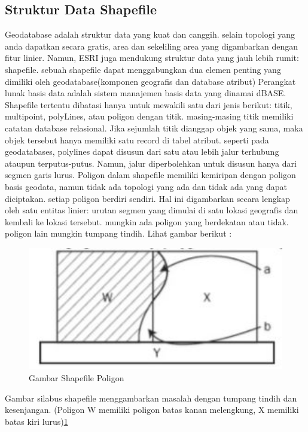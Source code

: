 \subsection{Struktur Data Shapefile}
Geodatabase adalah struktur data yang kuat dan canggih. selain topologi yang anda dapatkan secara gratis, area dan sekeliling area yang
digambarkan dengan fitur linier. Namun, ESRI juga mendukung struktur data yang jauh lebih rumit: shapefile. sebuah shapefile dapat menggabungkan dua elemen penting yang dimiliki oleh geodatabase(komponen geografis dan database atribut) Perangkat lunak 
basis data adalah sistem manajemen basis data yang dinamai dBASE. Shapefile tertentu dibatasi hanya untuk mewakili satu dari jenis berikut: titik, multipoint, polyLines, atau poligon dengan titik. masing-masing titik memiliki catatan database relasional. Jika sejumlah titik dianggap objek yang sama, maka objek tersebut hanya memiliki satu record di tabel atribut. seperti pada geodatabases, polylines dapat disusun dari satu atau lebih jalur terhubung ataupun terputus-putus. Namun, jalur diperbolehkan untuk disusun hanya dari segmen garis lurus. Poligon dalam shapefile memiliki kemiripan dengan poligon basis geodata, namun tidak ada topologi yang ada dan tidak ada yang dapat diciptakan. setiap poligon berdiri sendiri. Hal ini digambarkan secara lengkap oleh satu entitas linier: urutan segmen yang dimulai di satu lokasi geografis dan kembali ke lokasi tersebut. mungkin ada poligon yang berdekatan atau tidak. poligon lain mungkin tumpang tindih. Lihat gambar berikut :
\begin{figure} [ht]
	\centerline{\includegraphics[width=1\textwidth]{figures/shapefilepoligon.JPG}}
	\caption{Gambar Shapefile Poligon}
	\label{shapefilepoligon}
	\end{figure}
Gambar silabus shapefile menggambarkan masalah dengan tumpang tindih dan kesenjangan. (Poligon W memiliki poligon batas kanan melengkung, X memiliki batas kiri lurus)\ref{shapefilepoligon}

